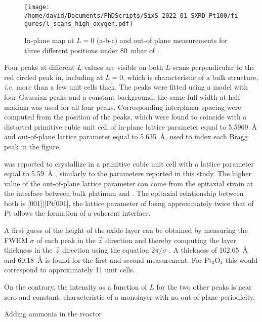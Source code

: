 \begin{figure}[!htb]
    \centering
    \texttt{[image: /home/david/Documents/PhDScripts/SixS\_2022\_01\_SXRD\_Pt100/figures/l\_scans\_high\_oxygen.pdf]}
    \caption{
        In-plane map at $L=0$ (a-b-c) and out-of plane measurements for three different positions under \qty{80}{\milli\bar} of \dioxygen.
    }
    \label{fig:LScansHighOxygenPt100}
\end{figure}

Four peaks at different $L$ values are visible on both $L$-scans perpendicular to the red circled peak in, including at $L=0$, which is characteristic of a bulk structure, \textit{i.e.} more than a few unit cells thick.
The peaks were fitted using a model with four Gaussian peaks and a constant background, the same full width at half maxima was used for all four peaks.
Corresponding interplanar spacing were computed from the position of the peaks, which were found to coincide with a distorted primitive cubic unit cell of in-plane lattice parameter equal to \qty{5.5969}{\angstrom} and out-of-plane lattice parameter equal to \qty{5.635}{\angstrom}, used to index each Bragg peak in the figure.

 was reported to crystallize in a primitive cubic unit cell with a lattice parameter equal to \qty{5.59}{\angstrom} \parencite{Moore1941, Galloni1952, MULLER1968, Seriani2006}, similarly to the parameters reported in this study.
The higher value of the out-of-plane lattice parameter can come from the epitaxial strain at the interface between bulk platinum and .
The epitaxial relationship between both is [001]||Pt[001], the lattice parameter of  being approximately twice that of Pt allows the formation of a coherent interface.

A first guess of the height of the oxide layer can be obtained by measuring the FWHM $\sigma$ of each peak in the $\vec{z}$ direction and thereby computing the layer thickness in the $\vec{z}$ direction using the equation $2\pi/\sigma$ \parencite{Warren1990}.
A thickness of \qty{162.65}{\angstrom} and \qty{60.18}{\angstrom} is found for the first and second measurement.
For Pt$_3$O$_4$ this would correspond to approximately 11 unit cells.

On the contrary, the intensity as a function of $L$ for the two other peaks is near zero and constant, characteristic of a monolayer with no out-of-plane periodicity.

Adding ammonia in the reactor

